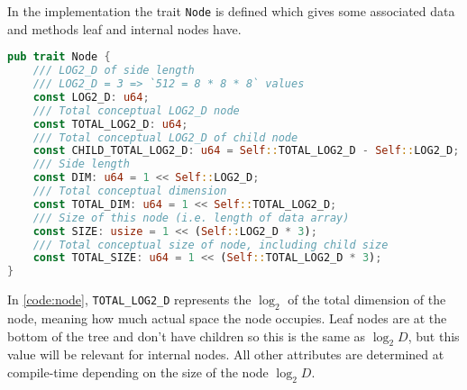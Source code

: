 In the implementation the trait \verb|Node| is defined which gives some associated data and methods leaf and internal nodes have.

\begin{lstlisting}[language=rust,caption={\texttt{Node} trait definition},captionpos=b,label={code:node}]
pub trait Node {
    /// LOG2_D of side length
    /// LOG2_D = 3 => `512 = 8 * 8 * 8` values
    const LOG2_D: u64;
    /// Total conceptual LOG2_D node
    const TOTAL_LOG2_D: u64;
    /// Total conceptual LOG2_D of child node
    const CHILD_TOTAL_LOG2_D: u64 = Self::TOTAL_LOG2_D - Self::LOG2_D;
    /// Side length
    const DIM: u64 = 1 << Self::LOG2_D;
    /// Total conceptual dimension
    const TOTAL_DIM: u64 = 1 << Self::TOTAL_LOG2_D;
    /// Size of this node (i.e. length of data array)
    const SIZE: usize = 1 << (Self::LOG2_D * 3);
    /// Total conceptual size of node, including child size
    const TOTAL_SIZE: u64 = 1 << (Self::TOTAL_LOG2_D * 3);
}
\end{lstlisting}

In \cref{code:node}, \verb|TOTAL_LOG2_D| represents the $\log_{2}$ of the total dimension of the node, meaning how much actual space the node occupies. Leaf nodes are at the bottom of the tree and don't have children so this is the same as $\log_{2} D$, but this value will be relevant for internal nodes. All other attributes are determined at compile-time depending on the size of the node $\log_{2} D$.

